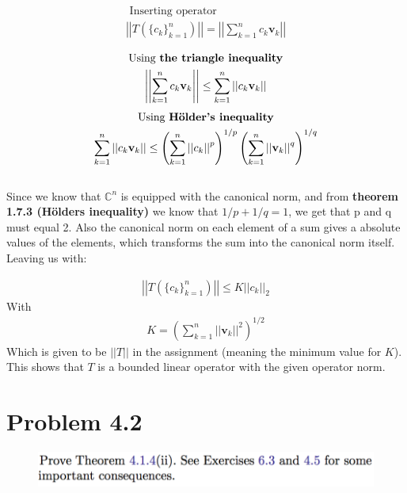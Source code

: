 \documentclass{article}
\begin{document}
\begin{gather*}
 \text{ Inserting operator }\\ 
    \left|\left| T (\{c_k\}_{k=1}^n)\right|\right| = \left|\left| \sum_{k=1}^n c_k \mathbf{v}_k \right|\right|\\
\end{gather*}
\vspace{-1cm}
\begin{gather*}
     \text{ Using \textbf{the triangle inequality} } \\
    \left|\left| \sum_{k=1}^n c_k \mathbf{v}_k \right|\right| \leq  \sum_{k=1}^n \left|\left| c_k \mathbf{v}_k \right|\right| \\
\end{gather*}
\vspace{-1cm}
\begin{gather*}
    \text{ Using \textbf{Hölder's inequality} } \\
    \sum_{k=1}^n \left|\left| c_k \mathbf{v}_k \right|\right| \leq \left( \sum_{k=1}^n \left|\left| c_k \right|\right|^p \right)^{1/p} \left(\sum_{k=1}^n \left|\left| \mathbf{v}_k \right|\right|^q \right)^{1/q} 
\end{gather*}\\ 

Since we know that $\mathbb{C}^n$ is equipped with the canonical norm, and from \textbf{theorem 1.7.3 (Hölders inequality)} we know that $1/p+1/q=1$, we get that p and q must equal 2. Also the canonical norm on each element of a sum gives a absolute values of the elements, which transforms the sum into the canonical norm itself. Leaving us with: 

\begin{gather*}
    \left|\left| T (\{c_k\}_{k=1}^n)\right|\right| \leq K \left|\left| c_k \right|\right|_2
\end{gather*}
 With 
 \begin{gather*}
     K=\left(\sum_{k=1}^n \left|\left| \mathbf{v}_k \right|\right|^2 \right)^{1/2} 
 \end{gather*}
 Which is given to be $||T||$ in the assignment (meaning the minimum value for $K$). This shows that $T$ is a bounded linear operator with the given operator norm.
 
 
 
 
 
\section*{Problem 4.2}
\begin{figure}[h!]
    \centering
    \includegraphics[width=\textwidth]{Fig/prob42}
\end{figure}
\end{document}

